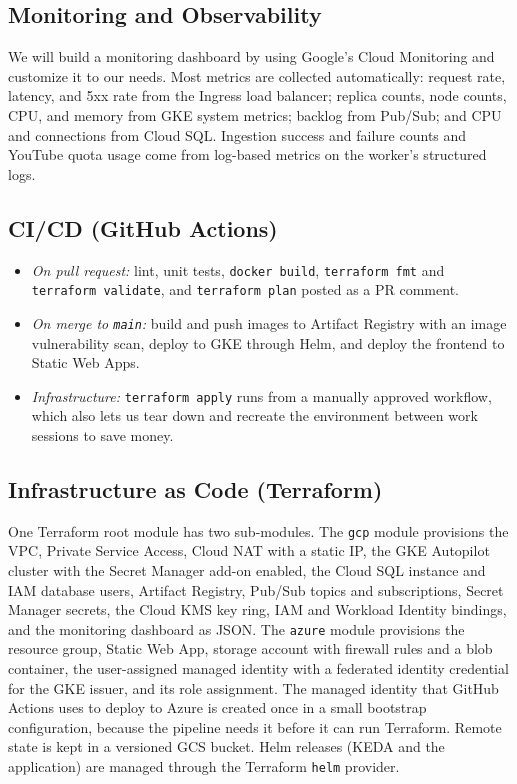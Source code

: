 \documentclass[conference]{IEEEtran}
\begin{document}
\subsection{Monitoring and Observability}
\label{sec:monitoring}
We will build a monitoring dashboard by using Google's Cloud Monitoring and customize it to our needs. Most metrics are collected automatically: request rate, latency, and 5xx rate from the Ingress load balancer; replica counts, node counts, CPU, and memory from GKE system metrics; backlog from Pub/Sub; and CPU and connections from Cloud SQL. Ingestion success and failure counts and YouTube quota usage come from log-based metrics on the worker's structured logs.

\subsection{CI/CD (GitHub Actions)}
\begin{itemize}
\item \emph{On pull request:} lint, unit tests, \texttt{docker build}, \texttt{terraform fmt} and \texttt{terraform validate}, and \texttt{terraform plan} posted as a PR comment.
\item \emph{On merge to \texttt{main}:} build and push images to Artifact Registry with an image vulnerability scan, deploy to GKE through Helm, and deploy the frontend to Static Web Apps.
\item \emph{Infrastructure:} \texttt{terraform apply} runs from a manually approved workflow, which also lets us tear down and recreate the environment between work sessions to save money.
\end{itemize}

\subsection{Infrastructure as Code (Terraform)}
One Terraform root module has two sub-modules. The \texttt{gcp} module provisions the VPC, Private Service Access, Cloud NAT with a static IP, the GKE Autopilot cluster with the Secret Manager add-on enabled, the Cloud SQL instance and IAM database users, Artifact Registry, Pub/Sub topics and subscriptions, Secret Manager secrets, the Cloud KMS key ring, IAM and Workload Identity bindings, and the monitoring dashboard as JSON. The \texttt{azure} module provisions the resource group, Static Web App, storage account with firewall rules and a blob container, the user-assigned managed identity with a federated identity credential for the GKE issuer, and its role assignment. The managed identity that GitHub Actions uses to deploy to Azure is created once in a small bootstrap configuration, because the pipeline needs it before it can run Terraform. Remote state is kept in a versioned GCS bucket. Helm releases (KEDA and the application) are managed through the Terraform \texttt{helm} provider.
\end{document}

